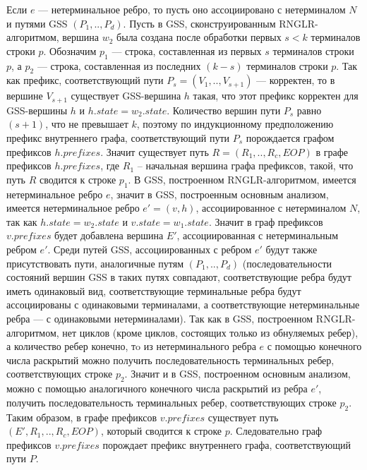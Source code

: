 Если $e$ --- нетерминальное ребро, то пусть оно ассоциировано с нетерминалом $N$ и путями GSS $(P_{1},..,P_{d})$. Пусть в GSS, сконструированным RNGLR-алгоритмом, вершина $w_{2}$ была создана после обработки первых $s < k$ терминалов строки $p$. Обозначим $p_{1}$ --- строка, составленная из первых $s$ терминалов строки $p$, а $p_{2}$ --- строка, составленная из последних $(k - s)$ терминалов строки $p$. Так как префикс, соответствующий пути $P_{s} = (V_{1},..,V_{s+1})$ --- корректен, то в вершине $V_{s+1}$ существует GSS-вершина $h$ такая, что этот префикс корректен для GSS-вершины $h$ и $h.state = w_{2}.state$. Количество вершин пути $P_{s}$ равно $(s + 1)$, что не превышает $k$, поэтому по индукционному предположению префикс внутреннего графа, соответствующий пути $P_{s}$ порождается графом префиксов $h.prefixes$.  Значит существует путь $R = (R_{1},..,R_{c},EOP)$ в графе префиксов $h.prefixes$, где $R_{1}$ -- начальная вершина графа префиксов, такой, что путь $R$ сводится к строке $p_{1}$. В GSS, построенном RNGLR-алгоритмом, имеется нетерминальное ребро $e$, значит в GSS, построенным основным анализом, имеется нетерминальное ребро $e' = (v, h)$, ассоциированное с нетерминалом $N$, так как $h.state = w_{2}.state$ и $v.state = w_{1}.state$. Значит в граф префиксов $v.prefixes$ будет добавлена вершина $E'$, ассоциированная с нетерминальным ребром $e'$. Среди путей GSS, ассоциированных с ребром $e'$ будут также присутствовать пути, аналогичные путям $(P_{1},..,P_{d})$ (последовательности состояний вершин GSS в таких путях совпадают, соответствующие ребра будут иметь одинаковый вид, соответствующие терминальные ребра будут ассоциированы с одинаковыми терминалами, а соответствующие нетерминальные ребра --- с одинаковыми нетерминалами). Так как в GSS, построенном RNGLR-алгоритмом, нет циклов (кроме циклов, состоящих только из обнуляемых ребер), а количество ребер конечно, тo из нетерминального ребра $e$ с помощью конечного числа раскрытий можно получить последовательность терминальных ребер, соответствующих строке $p_{2}$. Значит и в GSS, построенном основным анализом, можно с помощью аналогичного конечного числа раскрытий из ребра $e'$, получить последовательность терминальных ребер, соответствующих строке $p_{2}$. Таким образом, в графе префиксов $v.prefixes$ существует путь $(E',R_{1},..,R_{c},EOP)$, который сводится к строке $p$. Следовательно граф префиксов $v.prefixes$ порождает префикс внутреннего графа, соответствующий пути $P$.
% 

